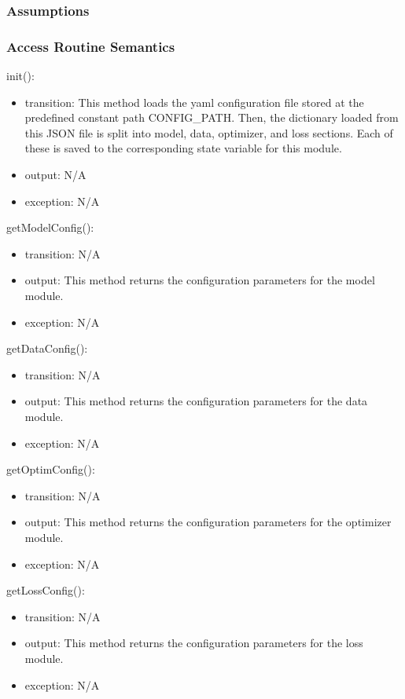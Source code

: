 \documentclass[12pt, titlepage]{article}
\begin{document}
\subsubsection{Assumptions}



\subsubsection{Access Routine Semantics}
\noindent init():
\begin{itemize}
  \item transition: This method loads the yaml configuration file stored at the predefined constant path CONFIG\_PATH. Then, the dictionary loaded from this JSON file is split into model, data, optimizer, and loss sections. Each of these is saved to the corresponding state variable for this module.
  \item output: N/A
  \item exception: N/A
\end{itemize}

\noindent getModelConfig():
\begin{itemize}
\item transition: N/A 
\item output: This method returns the configuration parameters for the model module.
\item exception: N/A
\end{itemize}

\noindent getDataConfig():
\begin{itemize}
  \item transition: N/A
  \item output: This method returns the configuration parameters for the data module.
  \item exception: N/A
\end{itemize}

\noindent getOptimConfig():
\begin{itemize}
  \item transition: N/A
  \item output: This method returns the configuration parameters for the optimizer module.
  \item exception: N/A
\end{itemize}

\noindent getLossConfig():
\begin{itemize}
  \item transition: N/A
  \item output: This method returns the configuration parameters for the loss module.
  \item exception: N/A
\end{itemize}
\end{document}
